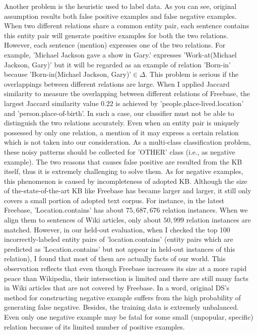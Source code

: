 \documentclass[10pt]{article} %
\theoremstyle{definition}
\theoremstyle{definition}
\begin{document}
Another problem is the heuristic used to label data. 
As you can see, original assumption results both false positive examples and false negative examples. 
When two different relations share a common entity pair, each sentence contains this entity pair will generate positive examples for both the two relations. 
However, each sentence (mention) expresses one of the two relations. 
For example, 'Michael Jackson gave a show in Gary.' expresses 'Work-at(Michael Jackson, Gary)' but it will be regarded as an example of relation 'Born-in' because 'Born-in(Michael Jackson, Gary)'$\in\Delta$. 
This problem is serious if the overlappings between different relations are large. 
When I applied Jaccard similarity to measure the overlapping between different relations of Freebase, 
the largest Jaccard similarity value $0.22$ is achieved by 'people.place-lived.location' and 'person.place-of-birth'. 
In such a case, our classifier must not be able to distinguish the two relations accurately. 
Even when an entity pair is uniquely possessed by only one relation, a mention of it may express a certain relation which is not taken into our consideration. 
As a multi-class classification problem, these noisy patterns should be collected for 'OTHER' class (i.e., as negative example). 
The two reasons that causes false positive are resulted from the KB itself, thus it is extremely challenging to solve them. 
As for negative examples, this phenomenon is caused by incompleteness of adopted KB. 
Although the size of the-state-of-the-art KB like Freebase has became larger and larger, it still only covers a small portion of adopted text corpus. 
For instance, in the latest Freebase, 'Location.contains' has about $75,687,676$ relation instances. 
When we align them to sentences of Wiki articles, only about $50,999$ relation instances are matched. 
However, in our held-out evaluation, when I checked the top 100 incorrectly-labeled entity pairs of 'location.contains' 
(entity pairs which are predicted as 'Location.contains' but not appear in held-out instances of this relation), 
I found that most of them are actually facts of our world. 
This observation reflects that even though Freebase increases its size at a more rapid peace than Wikipedia, 
their intersection is limited and there are still many facts in Wiki articles that are not covered by Freebase. 
In a word, original DS's method for constructing negative example suffers from the high probability of generating false negative. 
Besides, the training data is extremely unbalanced. 
Even only one negative example may be fatal for some small (unpopular, specific) relation because of its limited number of positive examples. 
\end{document}
